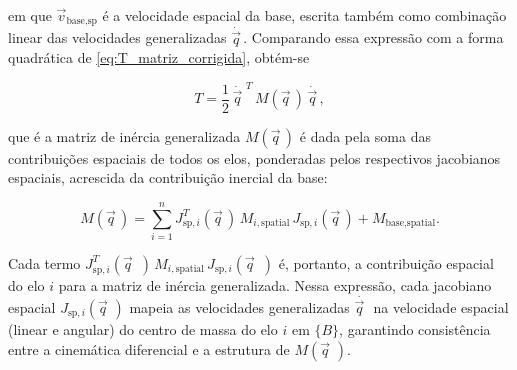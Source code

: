 em que $\vec v_{\text{base,sp}}$ é a velocidade espacial da base, escrita
também como combinação linear das velocidades generalizadas
$\dot{\vec q\, }$.
Comparando essa expressão com a forma quadrática de \eqref{eq:T_matriz_corrigida}, obtém-se

\begin{equation}
T =
\frac{1}{2}\,\dot{\vec q\, }^{\,T}\,M(\vec q\, )\,\dot{\vec q\, },
\end{equation}

que é a matriz de inércia generalizada $M(\vec q\, )$ é dada pela soma das
contribuições espaciais de todos os elos, ponderadas pelos respectivos
jacobianos espaciais, acrescida da contribuição inercial da base:

\begin{equation}
M(\vec q\, ) =
\sum_{i=1}^{n}
J_{\text{sp},i}^{T}(\vec q\, )\,
M_{i,\text{spatial}}\,
J_{\text{sp},i}(\vec q\, )
+
M_{\text{base},\text{spatial}}.
\label{eq:M_total_formula_corrigida}
\end{equation}

Cada termo
$J_{\text{sp},i}^{T}(\vec q\, \, \, )\,M_{i,\text{spatial}}\,J_{\text{sp},i}(\vec q\, \, \, )$
é, portanto, a contribuição espacial do elo $i$ para a matriz de inércia
generalizada.
Nessa expressão, cada jacobiano espacial $J_{\text{sp},i}(\vec q\, \, )$ mapeia as
velocidades generalizadas $\dot{\vec q\, \, }$ na velocidade espacial (linear e
angular) do centro de massa do elo $i$ em $\{B\}$, garantindo consistência
entre a cinemática diferencial e a estrutura de $M(\vec q\, \, )$.
